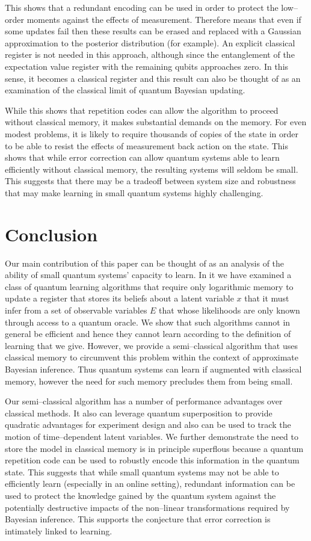 \documentclass[aps,amsmath,onecolumn,amssymb,notitlepage]{revtex4-1}
\begin{document}
This shows that a redundant encoding can be used in order to protect the low--order moments against the effects of measurement.  Therefore means that even if some updates fail then these results can be erased and replaced with a Gaussian approximation to the posterior distribution (for example).  An explicit classical register is not needed in this approach, although since the entanglement of the expectation value register with the remaining qubits approaches zero.  In this sense, it becomes a classical register and this result can also be thought of as an examination of the classical limit of quantum Bayesian updating.

While this shows that repetition codes can allow the algorithm to proceed without classical memory, it makes substantial demands on the memory.  For even modest problems, it is likely to require thousands of copies of the state in order to be able to resist the effects of measurement back action on the state.  This shows that while error correction can allow quantum systems able to learn efficiently without classical memory, the resulting systems will seldom be small.  This suggests that there may be a tradeoff between system size and robustness that may make learning in small quantum systems highly challenging.

\section{Conclusion}
Our main contribution of this paper can be thought of as an analysis of the ability of small quantum systems' capacity to learn.  In it we have examined a class of quantum learning algorithms that require only logarithmic memory to update a register that stores its beliefs about a latent variable $x$ that it must infer from a set of observable variables $E$ that whose likelihoods are only known through access to a quantum oracle.  We show that such algorithms cannot in general be efficient and hence they cannot learn according to the definition of learning that we give.  However, we provide a semi--classical algorithm that uses classical memory to circumvent this problem within the context of approximate Bayesian inference.  Thus quantum systems can learn if augmented with classical memory, however the need for such memory precludes them from being small.

Our semi--classical algorithm has a number of performance advantages over classical methods.  It also can leverage quantum superposition to provide quadratic advantages for experiment design and also can be used to track the motion of time--dependent latent variables.  We further demonstrate the need to store the model in classical memory is in principle superflous because a quantum repetition code can be used to robustly encode this information in the quantum state.  This suggests that while small quantum systems may not be able to efficiently learn (especially in an online setting), redundant information can be used to protect the knowledge gained by the quantum system against the potentially destructive impacts of the non--linear transformations required by Bayesian inference.  This supports the conjecture that error correction is intimately linked to  learning.  
\end{document}
